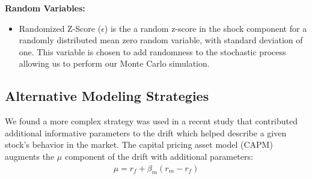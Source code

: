 \documentclass{article}
\begin{document}
\noindent\textbf{Random Variables:}\\
\begin{itemize}
\item Randomized Z-Score ($\epsilon$) is the a random z-score in the shock component for a randomly distributed mean zero random variable, with standard deviation of one. This variable is chosen to add randomness to the stochastic process allowing us to perform our Monte Carlo simulation.
\end{itemize}

\subsection{Alternative Modeling Strategies}

We found a more complex strategy was used in a recent study that contributed additional informative parameters to the drift which helped describe a given stock's behavior in the market. The capital pricing asset model (CAPM) augments the $\mu$ component of the drift with additional parameters:
\begin{align*}
\mu = r_{f} + \beta_{m}(r_{m} - r_{f})
\end{align*}
\end{document}
